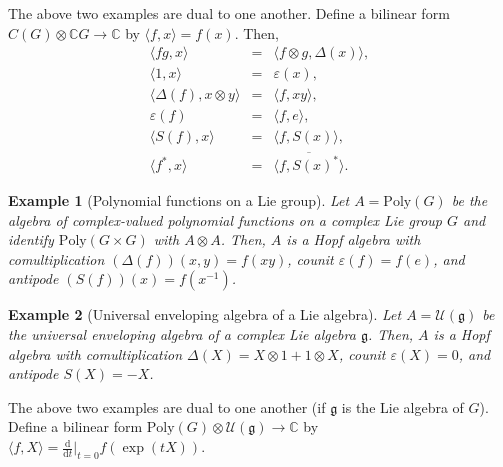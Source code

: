 \documentclass[12pt]{article}
\newcommand*{\Cset}{\mathbb{C}}
\renewcommand*{\d}{\mathrm{d}}
\newcommand*{\deriv}[2]{\frac{\d #1}{\d #2}}
\theoremstyle{inlinedefn}
\theoremstyle{break}
\newtheorem{example}{Example}
\begin{document}
The above two examples are dual to one another.
Define a bilinear form $C(G) \otimes \Cset G \to \Cset$ by
$\langle f,x \rangle = f(x)$.
Then,
\begin{eqnarray*}
\langle fg, x \rangle & = & \langle f \otimes g, \Delta(x) \rangle, \\
\langle 1, x \rangle & = & \varepsilon(x), \\
\langle \Delta(f), x \otimes y \rangle & = & \langle f, xy \rangle, \\
\varepsilon(f) & = & \langle f, e \rangle, \\
\langle S(f), x \rangle & = & \langle f, S(x) \rangle, \\
\langle f^*, x \rangle & = & \overline{\langle f, S(x)^* \rangle}.
\end{eqnarray*}

\begin{example}[Polynomial functions on a Lie group]
Let $A = \mathrm{Poly}(G)$ be the algebra of complex-valued polynomial functions on a complex Lie group $G$ and identify $\mathrm{Poly}(G\times G)$ with $A \otimes A$.
Then, $A$ is a Hopf algebra with comultiplication $(\Delta(f))(x,y) = f(xy)$,
counit $\varepsilon(f) = f(e)$,
and antipode $(S(f))(x) = f(x^{-1})$.
\end{example}

\begin{example}[Universal enveloping algebra of a Lie algebra]
Let $A = \mathcal{U}(\mathfrak{g})$ be the universal enveloping algebra of a complex Lie algebra $\mathfrak{g}$.
Then, $A$ is a Hopf algebra with comultiplication $\Delta(X) = X\otimes1+1\otimes X$,
counit $\varepsilon(X) = 0$,
and antipode $S(X) = -X$.
\end{example}

The above two examples are dual to one another (if $\mathfrak{g}$ is the Lie algebra of $G$).
Define a bilinear form $\mathrm{Poly}(G) \otimes \mathcal{U}(\mathfrak{g}) \to \Cset$ by
$\langle f,X \rangle = \deriv{}{t}\big|_{t=0} f(\exp(tX))$.
\end{document}
